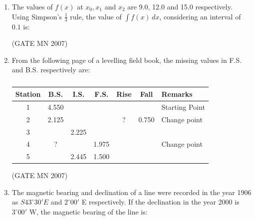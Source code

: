 \documentclass[journal]{IEEEtran}
\begin{document}
\begin{enumerate}
\item The values of $f(x)$ at $x_0, x_1$ and $x_2$ are 9.0, 12.0 and 15.0 respectively. Using Simpson's $\frac{1}{3}$ rule, the value of $\int f(x) \, dx$, considering an interval of $0.1$ is:
	
	\hfill (GATE MN 2007)
\begin{enumerate}
\end{enumerate}


\item From the following page of a levelling field book, the missing values in F.S. and B.S. respectively are:

\begin{table}[H]
    \centering\normalsize
\begin{tabular}{|c|c|c|c|c|c|l|}
\hline
Station & B.S. & I.S. & F.S. & Rise & Fall & Remarks \\
\hline
1 & 4.550 &     &     &      &      & Starting Point \\
\hline
2 & 2.125 &     &     &  ?    & 0.750 & Change point \\
\hline
3 &       & 2.225 &     &      &      &  \\
\hline
4 &    ?   &     & 1.975 &      &      & Change point \\
\hline
5 &       & 2.445 & 1.500 &      &      &  \\
\hline
\end{tabular}
    \caption{}
    \label{tab:Q69}
\end{table}


\hfill (GATE MN 2007)
\begin{enumerate}
\end{enumerate}


\item The magnetic bearing and declination of a line were recorded in the year 1906 as $S43^\circ 30' E$ and $2^\circ 00'$ E respectively. If the declination in the year 2000 is $3^\circ 00'$ W, the magnetic bearing of the line is:



\end{enumerate}
\end{document}
